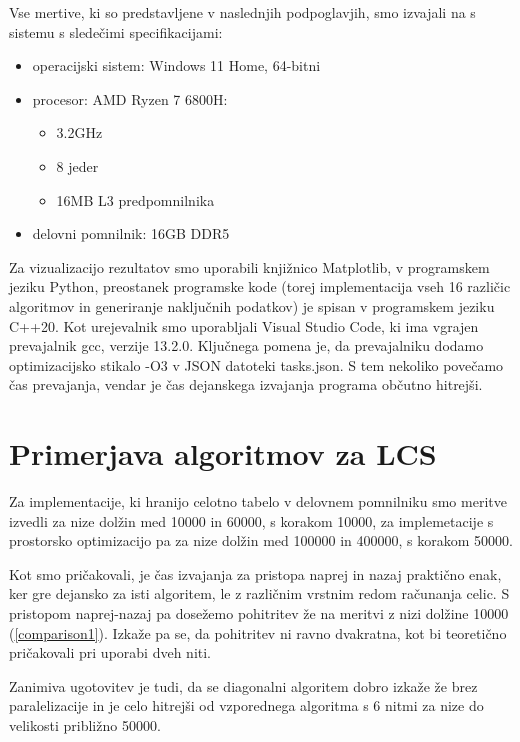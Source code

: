 \documentclass[a4paper,12pt,openright]{book}
\begin{document}
Vse mertive, ki so predstavljene v naslednjih podpoglavjih, smo izvajali na s sistemu s sledečimi specifikacijami:
\begin{itemize}
    \item operacijski sistem: Windows 11 Home, 64-bitni
    \item procesor: AMD Ryzen 7 6800H:
        \begin{itemize}
            \item 3.2GHz
            \item 8 jeder
            \item 16MB L3 predpomnilnika
        \end{itemize}
    \item delovni pomnilnik: 16GB DDR5
\end{itemize}

Za vizualizacijo rezultatov smo uporabili knjižnico Matplotlib, v programskem jeziku Python, preostanek programske kode (torej implementacija vseh 16 različic algoritmov in generiranje naključnih podatkov) je spisan v programskem jeziku C++20. Kot urejevalnik smo uporabljali Visual Studio Code, ki ima vgrajen prevajalnik gcc, verzije 13.2.0. Ključnega pomena je, da prevajalniku dodamo optimizacijsko stikalo -O3 \cite{compilerFlag} v JSON datoteki tasks.json. S tem nekoliko povečamo čas prevajanja, vendar je čas dejanskega izvajanja programa občutno hitrejši. 

\section{Primerjava algoritmov za LCS}

Za implementacije, ki hranijo celotno tabelo v delovnem pomnilniku smo meritve izvedli za nize dolžin med 10000 in 60000, s korakom 10000, za implemetacije s prostorsko optimizacijo pa za nize dolžin med 100000 in 400000, s korakom 50000. \bigskip

Kot smo pričakovali, je čas izvajanja za pristopa naprej in nazaj praktično enak, ker gre dejansko za isti algoritem, le z različnim vrstnim redom računanja celic. S pristopom naprej-nazaj pa dosežemo pohitritev že na meritvi z nizi dolžine 10000 (\ref{comparison1}). Izkaže pa se, da pohitritev ni ravno dvakratna, kot bi teoretično pričakovali pri uporabi dveh niti. 

Zanimiva ugotovitev je tudi, da se diagonalni algoritem dobro izkaže že brez paralelizacije in je celo hitrejši od vzporednega algoritma s 6 nitmi za nize do velikosti približno 50000. \bigskip 
\end{document}
